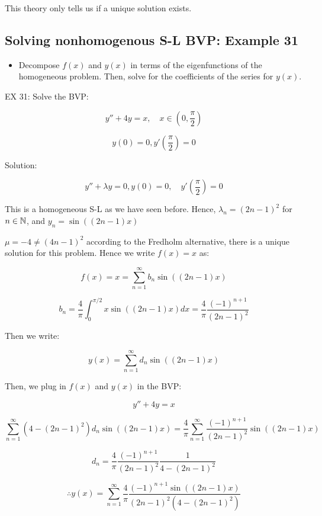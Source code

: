 \documentclass{article}
\begin{document}
This theory only tells us if a unique solution exists. 

\subsection{Solving nonhomogenous S-L BVP: Example 31}

\begin{itemize}
    \item Decompose $f(x)$ and $y(x)$ in terms of the eigenfunctions of the homogeneous problem. Then, solve for the coefficients of the series for $y(x)$.  
\end{itemize}

EX 31: Solve the BVP:

$$y'' + 4y = x, \quad x \in (0, \frac{\pi}{2})$$

$$y(0) = 0, y'(\frac{\pi}{2}) = 0$$

Solution:

$$y'' + \lambda y = 0, y(0) = 0, \quad y'(\frac{\pi}{2}) = 0$$

This is a homogeneous S-L as we have seen before. Hence, $\lambda_n = (2n-1)^2$ for $n \in \mathbb{N}$, and $y_n = \sin((2n-1) x)$

$\mu = -4 \neq (4n-1)^2$ according to the Fredholm alternative, there is a unique solution for this problem. Hence we write $f(x) = x$ as:

$$f(x) = x = \sum_{n=1}^\infty b_n \sin \left( (2n-1) x \right)$$

$$b_n = \frac{4}{\pi} \int_0^{\pi/2} x \sin \left( (2n-1) x \right) dx = \frac{4}{\pi} \frac{(-1)^{n+1}}{(2n-1)^2}$$

Then we write:

$$y(x) = \sum_{n=1}^\infty d_n \sin \left( (2n-1) x \right)$$

Then, we plug in $f(x)$ and $y(x)$ in the BVP: 

$$y'' + 4y = x$$

$$\sum_{n=1}^\infty \left( 4 - (2n-1)^2 \right) d_n \sin \left( (2n-1) x \right) = \frac{4}{\pi} \sum_{n=1}^\infty  \frac{(-1)^{n+1}}{(2n-1)^2} \sin \left( (2n-1) x \right)$$

$$d_n = \frac{4}{\pi} \frac{(-1)^{n+1}}{(2n-1)^2} \frac{1}{4 - (2n-1)^2}$$

$$\therefore y(x) = \sum_{n=1}^\infty \frac{4}{\pi} \frac{(-1)^{n+1} \sin((2n-1) x)}{(2n-1)^2 \left( 4 - (2n-1)^2 \right)}$$
\end{document}
